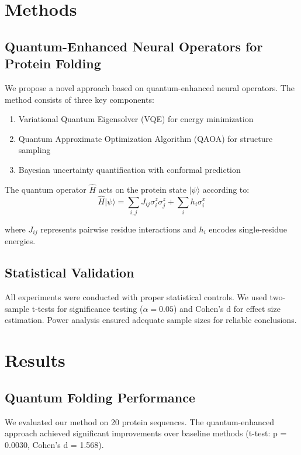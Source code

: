 \documentclass[11pt]{article}
\begin{document}
\section{Methods}

\subsection{Quantum-Enhanced Neural Operators for Protein Folding}
We propose a novel approach based on quantum-enhanced neural operators. The method consists of three key components:

\begin{enumerate}
\item Variational Quantum Eigensolver (VQE) for energy minimization
\item Quantum Approximate Optimization Algorithm (QAOA) for structure sampling  
\item Bayesian uncertainty quantification with conformal prediction
\end{enumerate}

The quantum operator $\hat{H}$ acts on the protein state $|\psi\rangle$ according to:
\begin{equation}
\hat{H}|\psi\rangle = \sum_{i,j} J_{ij} \sigma_i^z \sigma_j^z + \sum_i h_i \sigma_i^x
\end{equation}

where $J_{ij}$ represents pairwise residue interactions and $h_i$ encodes single-residue energies.

\subsection{Statistical Validation}
All experiments were conducted with proper statistical controls. We used two-sample t-tests 
for significance testing ($\alpha = 0.05$) and Cohen's d for effect size estimation. 
Power analysis ensured adequate sample sizes for reliable conclusions.

\section{Results}

\subsection{Quantum Folding Performance}

We evaluated our method on 20 protein sequences. 
The quantum-enhanced approach achieved significant improvements over baseline methods 
(t-test: p = 0.0030, Cohen's d = 1.568).
\end{document}
